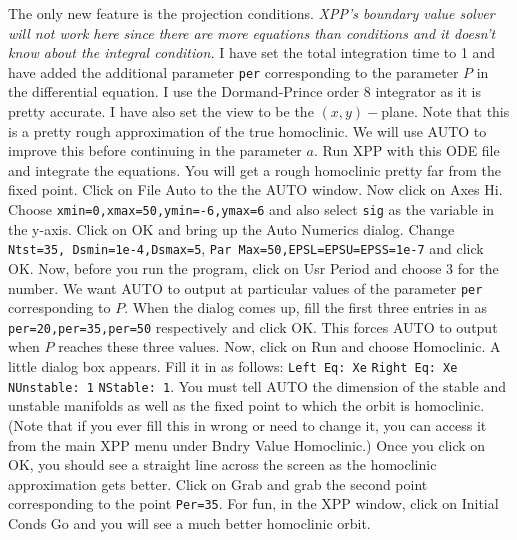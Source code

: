 \documentclass{article}
\begin{document}
The only new feature is the projection conditions. {\em XPP's boundary
value solver will not work here since there are more equations than
conditions and it doesn't know about the integral condition.} I have
set the total integration time to 1 and have added the additional
parameter {\tt per} corresponding to the parameter $P$ in the
differential equation.  I use the Dormand-Prince order 8 integrator as
it is pretty accurate.  I have also set the view to be the
$(x,y)-$plane. Note that this is a pretty rough approximation
of the true homoclinic. We will use AUTO to improve this before
continuing in the parameter $a$.  Run XPP with this ODE file and
integrate the equations. You will get a rough homoclinic pretty far
from the fixed point. Click on File Auto to the the AUTO window. Now
click on Axes Hi. Choose {\tt xmin=0,xmax=50,ymin=-6,ymax=6} and also
select {\tt sig} as the variable in the y-axis.  Click on OK and bring
up the Auto Numerics dialog.  Change {\tt Ntst=35, Dsmin=1e-4,Dsmax=5},
{\tt Par Max=50,EPSL=EPSU=EPSS=1e-7} and click OK. Now, before you run
the program, click on Usr Period and choose 3 for the number.  We want
AUTO to output at particular values of the parameter {\tt per}
corresponding to $P$. When the dialog comes up, fill the first three
entries in as {\tt per=20,per=35,per=50} respectively and click
OK. This forces AUTO to output when $P$ reaches these three values.
Now, click on Run and choose Homoclinic. A little dialog box
appears. Fill it in as follows: {\tt Left Eq: Xe}  {\tt Right Eq: Xe}
 {\tt NUnstable: 1}   {\tt NStable: 1}.  You must tell AUTO the
dimension of the stable and unstable manifolds as well as the fixed
point to which the orbit is homoclinic. (Note that if you ever fill this in
wrong or need to change it, you can access it from the main XPP menu
under Bndry Value Homoclinic.)   Once you click on OK, you should see
a straight line across the screen as the homoclinic approximation gets
better. Click on Grab and grab the second point corresponding to the
point {\tt Per=35}.  For fun, in the XPP window, click on Initial
Conds Go and you will see a much better homoclinic orbit.
\end{document}
